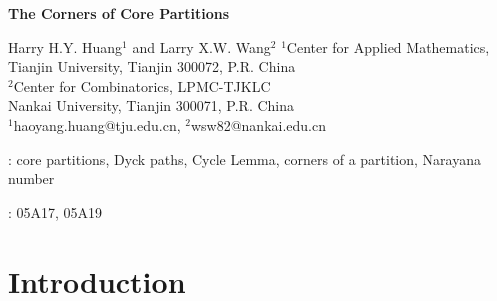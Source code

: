 \documentclass[a4paper,12pt]{article}
\begin{document}
\rule{0cm}{1cm}
\begin{center}
{\Large\bf The Corners of Core Partitions }
\end{center}
 \vskip 6mm
 \begin{center}
{\small
Harry H.Y. Huang$^1$ and Larry X.W. Wang$^2$}
\vskip 4mm $^{1}$Center for Applied Mathematics,\\
Tianjin University, Tianjin 300072, P.R. China \\[3mm]
\vskip 4mm $^{2}$Center for Combinatorics, LPMC-TJKLC\\
Nankai University, Tianjin 300071, P.R. China \\[3mm]
\vskip 4mm
$^1$haoyang.huang@tju.edu.cn,
$^2$wsw82@nankai.edu.cn \end{center}


\begin{abstract}




In this paper, we are concerned with the corners of core partitions. We introduce the concepts of stitches and anti-stitches, certain pairs of cells in a quotient space which we call wrap-up space. We prove that the anti-stitches of a rational Dyck path are in bijection with the segments of structure sets of the corresponding core partition, therefore the number of corners of a core partition can be counted by the number of stitches or anti-stitches. %
Based on these results, for coprime positive integers $a$ and $b$, we give two essentially different formulae for the number of corners in all $(a,b)$-cores. This leads to an unexpected identity, expressing the rational Catalan numbers as weighed sums of binomial numbers.
Moreover, we show that for an $(n,n+1)$-core partition $\lambda$  determined by a certain $(n,n+1)$-Dyck path $P$, the corners of $\lambda$ correspond to pairs of consecutive right steps in $P$.
As a consequence, we show that the number of $(n,n+1)$-cores with $k$ corners is the  Narayana number $N(n,k+1)$. We also extend these results to multi-cores.
\end{abstract}



: core partitions, Dyck paths, Cycle Lemma, corners of a partition, Narayana number

: 05A17, 05A19

\section{Introduction}
\end{document}
